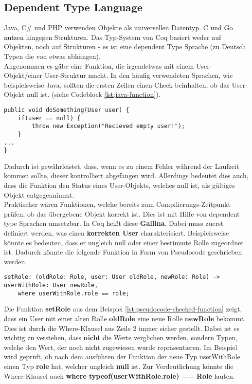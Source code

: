 \subsection{Dependent Type Language}
Java, C\# und PHP verwenden Objekte als universellen Datentyp. C und Go nutzen hingegen Strukturen. Das Typ-System von Coq basiert weder auf Objekten, noch auf Strukturen - es ist eine dependent Type Sprache (zu Deutsch Typen die von etwas abhängen).\\
Angenommen es gäbe eine Funktion, die irgendetwas mit einem User-Objekt/einer User-Struktur macht. In den häufig verwendeten Sprachen, wie beispielsweise Java, sollten die ersten Zeilen einen Check beinhalten, ob das User-Objekt null ist. (siehe Codeblock \ref{lst:java-function}).
\begin{lstlisting}[language=coq,firstnumber=1,caption=Java Funktion für den initialen Check auf null des User Objektes,label=lst:java-function]
public void doSomething(User user) {
	if(user == null) {
		throw new Exception("Recieved empty user!");
	}
...
}
\end{lstlisting}
Dadurch ist gewährleistet, dass, wenn es zu einem Fehler während der Laufzeit kommen sollte, dieser kontrolliert abgefangen wird. Allerdings bedeutet dies auch, dass die Funktion den Status eines User-Objekts, welches null ist, als gültiges Objekt entgegennimmt.\\
Praktischer wären Funktionen, welche bereits zum Compilierungs-Zeitpunkt prüfen, ob das übergebene Objekt korrekt ist.
Dies ist mit Hilfe von dependent type Sprachen umsetzbar. In Coq heißt diese \textbf{Gallina}. Dabei muss zuerst definiert werden, was einen \textbf{korrekten User} charakterisiert. Beispielsweise könnte es bedeuten, dass er ungleich null oder einer bestimmte Rolle zugeordnet ist. Dadurch könnte die folgende Funktion in Form von Pseudocode geschrieben werden.
\begin{lstlisting}[language=coq,firstnumber=1,caption=Pseudocode Check auf null des User Objektes,label=lst:pseudocode-checked-function]
setRole: (oldRole: Role, user: User oldRole, newRole: Role) -> userWithRole: User newRole,
	where userWithRole.role == role;
\end{lstlisting}
Die Funktion \textbf{setRole} aus dem Beispiel \ref{lst:pseudocode-checked-function} zeigt, dass ein User mit einer alten Rolle \textbf{oldRole} eine neue Rolle \textbf{newRole} bekommt. Dies ist durch die Where-Klausel aus Zeile 2 immer sicher gestellt. Dabei ist es wichtig zu verstehen, dass \textbf{nicht} die Werte verglichen werden, sondern Typen, welche den Wert, der noch nicht zugewiesen wurde repräsentieren. Im Beispiel wird geprüft, ob nach dem ausführen der Funktion der neue Typ userWithRole einen Typ \textbf{role} hat, welcher ungleich \textbf{null} ist. Zur Verdeutlichung könnte die Where-Klausel auch \textbf{where typeof(userWithRole.role) == Role} lauten.\\

